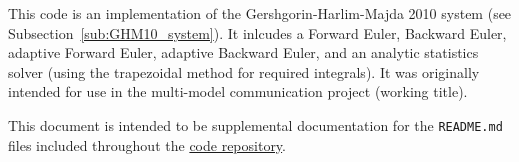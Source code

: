This code is an implementation of the Gershgorin-Harlim-Majda 2010 system (see Subsection~\ref{sub:GHM10_system}). It inlcudes a Forward Euler, Backward Euler, adaptive Forward Euler, adaptive Backward Euler, and an analytic statistics solver (using the trapezoidal method for required integrals). It was originally intended for use in the multi-model communication project (working title).

This document is intended to be supplemental documentation for the \texttt{README.md} files included throughout the \href{https://github.com/jasonltorchinsky/gershgorin-harlim-majda-2010}{code repository}.

